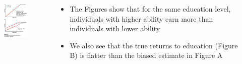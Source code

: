 \documentclass{beamer}
\begin{document}
\begin{frame}
\begin{columns}
	\begin{column}{0.48\textwidth}
	    \begin{figure}[h]
    		\includegraphics[width = 2.15in]{turner1e_fig_03_02.png}
   	 \end{figure}
	\end{column}
	\begin{column}{0.48\textwidth}
		\begin{itemize}
			\item The Figures show that for the same education level, individuals with higher ability earn more than individuals with lower ability \bigskip
			\item We also see that the true returns to education (Figure B) is flatter than the biased estimate in Figure A
		\end{itemize}
		
	\end{column}
\end{columns}


\end{frame}
\end{document}

